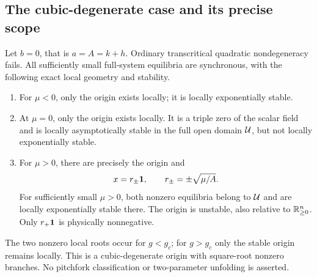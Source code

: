 \subsection{The cubic-degenerate case and its precise scope}
\label{slot:P09-3}

\begin{proposition}
\label{prop:P09-degenerate}
Let $b=0$, that is $a=A=k+h$. Ordinary transcritical quadratic
nondegeneracy fails. All sufficiently small full-system equilibria are
synchronous, with the following exact local geometry and stability.
\begin{enumerate}[label=(\roman*),leftmargin=*]
\item For $\mu<0$, only the origin exists locally; it is locally exponentially stable.
\item At $\mu=0$, only the origin exists locally. It is a triple zero
of the scalar field and is locally asymptotically stable in the full
open domain $\mathcal{U}$, but not locally exponentially stable.
\item For $\mu>0$, there are precisely the origin and
\begin{equation}
 x=r_\pm\mathbf{1},\qquad r_\pm=\pm\sqrt{\mu/A}.
 \label{eq:P09-square-root}
\end{equation}
For sufficiently small $\mu>0$, both nonzero equilibria belong to
$\mathcal{U}$ and are locally exponentially stable there. The origin is
unstable, also relative to $\mathbb{R}_{\geq 0}^{n}$. Only $r_+\mathbf{1}$ is physically
nonnegative.
\end{enumerate}
The two nonzero local roots occur for $g<g_c$; for $g>g_c$ only the
stable origin remains locally. This is a cubic-degenerate origin with
square-root nonzero branches. No pitchfork classification or
two-parameter unfolding is asserted.
\end{proposition}

